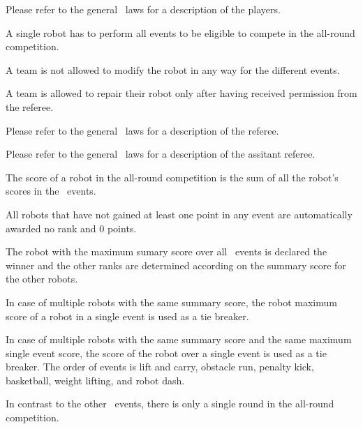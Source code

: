 \documentclass[12pt]{hurocup}
\begin{document}

Please refer to the general \HuroCup\ laws for a description of
the players.

\begin{lawlist}[ALR]
  
\item A single robot has to perform all events to be eligible to
 compete in the all-round competition.
  
\item A team is not allowed to modify the robot in any way for the
 different events.

\item A team is allowed to repair their robot only after having
 received permission from the referee.
  
\end{lawlist}


Please refer to the general \HuroCup\ laws for a description of
the referee.


Please refer to the general \HuroCup\ laws for a description of
the assitant referee.


\begin{lawlist}[ALR]

\item The score of a robot in the all-round competition is the sum of
 all the robot's scores in the \HuroCup\ events.

\end{lawlist}


\begin{lawlist}[ALR]

\item All robots that have not gained at least one point in any event
 are automatically awarded no rank and $0$ points.

\item The robot with the maximum sumary score over all \HuroCup\
 events is declared the winner and the other ranks are determined
 according on the summary score for the other robots.

\item In case of multiple robots with the same summary score, the
 robot maximum score of a robot in a single event is used as a tie
 breaker.

\item In case of multiple robots with the same summary score and the
 same maximum single event score, the score of the robot over a single
 event is used as a tie breaker. The order of events is lift and
 carry, obstacle run, penalty kick, basketball, weight lifting, and
 robot dash.

\item In contrast to the other \HuroCup\ events, there is only a
 single round in the all-round competition. 

\end{lawlist}
\end{document}
